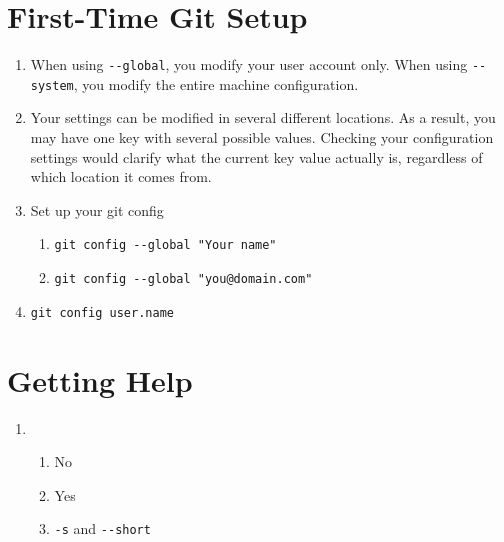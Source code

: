 \section{First-Time Git Setup}
\begin{enumerate}
    \item When using \verb+--global+, you modify your user account only.
        When using \verb+--system+, you modify the entire machine
        configuration.
    \item Your settings can be modified in several different locations.
        As a result, you may have one key with several possible values.
        Checking your configuration settings would clarify what the current
        key value actually is, regardless of which location it comes from.
    \item Set up your git config
        \begin{enumerate}
            \item \verb+git config --global "Your name"+
            \item \verb+git config --global "you@domain.com"+
        \end{enumerate}
    \item \verb+git config user.name+
\end{enumerate}

\section{Getting Help}
\begin{enumerate}
    \item
        \begin{enumerate}
            \item No
            \item Yes
            \item \verb+-s+ and \verb+--short+
        \end{enumerate}
\end{enumerate}
